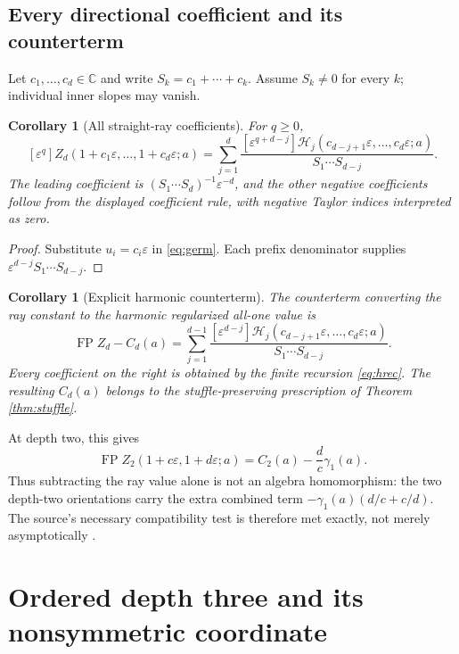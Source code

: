 \documentclass[11pt,a4paper]{article}
\numberwithin{equation}{section}
\newtheorem{corollary}[theorem]{Corollary}
\theoremstyle{definition}\newtheorem{definition}[theorem]{Definition}
\theoremstyle{remark}\newtheorem{remark}[theorem]{Remark}
\DeclareMathOperator{\FP}{FP}
\newcommand{\eps}{\varepsilon}
\newcommand{\HH}{\mathcal H}
\begin{document}
\subsection{Every directional coefficient and its counterterm}
Let $c_1,\ldots,c_d\in\mathbb C$ and write
$S_k=c_1+\cdots+c_k$. Assume $S_k\ne0$ for every $k$; individual inner
slopes may vanish.

\begin{corollary}[All straight-ray coefficients]\label{cor:rayall}
For $q\ge0$,
\begin{equation}\label{eq:allray}
 [\eps^q]Z_d(1+c_1\eps,\ldots,1+c_d\eps;a)
 =\sum_{j=1}^{d}
 \frac{[\eps^{q+d-j}]\HH_j(c_{d-j+1}\eps,\ldots,c_d\eps;a)}
      {S_1\cdots S_{d-j}}.
\end{equation}
The leading coefficient is $(S_1\cdots S_d)^{-1}\eps^{-d}$, and the
other negative coefficients follow from the displayed coefficient rule,
with negative Taylor indices interpreted as zero.
\end{corollary}
\begin{proof}
Substitute $u_i=c_i\eps$ in \eqref{eq:germ}. Each prefix denominator supplies $\eps^{d-j}S_1\cdots S_{d-j}$.
\end{proof}

\begin{corollary}[Explicit harmonic counterterm]\label{cor:counterterm}
The counterterm converting the ray constant to the harmonic regularized
all-one value is
\begin{equation}\label{eq:counterterm}
 \boxed{\displaystyle
 \FP Z_d-C_d(a)=
 \sum_{j=1}^{d-1}
 \frac{[\eps^{d-j}]\HH_j(c_{d-j+1}\eps,\ldots,c_d\eps;a)}
      {S_1\cdots S_{d-j}}.}
\end{equation}
Every coefficient on the right is obtained by the finite recursion
\eqref{eq:hrec}. The resulting $C_d(a)$ belongs to the
stuffle-preserving prescription of Theorem \ref{thm:stuffle}.
\end{corollary}

At depth two, this gives
\begin{equation}\label{eq:doubleFP}
 \FP Z_2(1+c\eps,1+d\eps;a)=C_2(a)-\frac dc\gamma_1(a).
\end{equation}
Thus subtracting the ray value alone is not an algebra homomorphism:
the two depth-two orientations carry the extra combined term
$-\gamma_1(a)(d/c+c/d)$. The source's necessary compatibility test is
therefore met exactly, not merely asymptotically \cite{repo-target}.

\section{Ordered depth three and its nonsymmetric coordinate}
\label{sec:triple}
\end{document}
